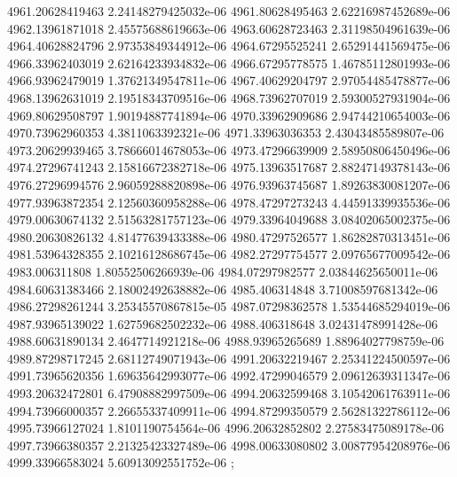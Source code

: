 {4961.20628419463 2.24148279425032e-06
4961.80628495463 2.62216987452689e-06
4962.13961871018 2.45575688619663e-06
4963.60628723463 2.31198504961639e-06
4964.40628824796 2.97353849344912e-06
4964.67295525241 2.65291441569475e-06
4966.33962403019 2.62164233934832e-06
4966.67295778575 1.46785112801993e-06
4966.93962479019 1.37621349547811e-06
4967.40629204797 2.97054485478877e-06
4968.13962631019 2.19518343709516e-06
4968.73962707019 2.59300527931904e-06
4969.80629508797 1.90194887741894e-06
4970.33962909686 2.94744210654003e-06
4970.73962960353 4.3811063392321e-06
4971.33963036353 2.43043485589807e-06
4973.20629939465 3.78666014678053e-06
4973.47296639909 2.58950806450496e-06
4974.27296741243 2.15816672382718e-06
4975.13963517687 2.88247149378143e-06
4976.27296994576 2.96059288820898e-06
4976.93963745687 1.89263830081207e-06
4977.93963872354 2.12560360958288e-06
4978.47297273243 4.44591339935536e-06
4979.00630674132 2.51563281757123e-06
4979.33964049688 3.08402065002375e-06
4980.20630826132 4.81477639433388e-06
4980.47297526577 1.86282870313451e-06
4981.53964328355 2.10216128686745e-06
4982.27297754577 2.09765677009542e-06
4983.006311808 1.80552506266939e-06
4984.07297982577 2.03844625650011e-06
4984.60631383466 2.18002492638882e-06
4985.406314848 3.71008597681342e-06
4986.27298261244 3.25345570867815e-05
4987.07298362578 1.53544685294019e-06
4987.93965139022 1.62759682502232e-06
4988.406318648 3.02431478991428e-06
4988.60631890134 2.4647714921218e-06
4988.93965265689 1.88964027798759e-06
4989.87298717245 2.68112749071943e-06
4991.20632219467 2.25341224500597e-06
4991.73965620356 1.69635642993077e-06
4992.47299046579 2.09612639311347e-06
4993.20632472801 6.47908882997509e-06
4994.20632599468 3.10542061763911e-06
4994.73966000357 2.26655337409911e-06
4994.87299350579 2.56281322786112e-06
4995.73966127024 1.8101190754564e-06
4996.20632852802 2.27583475089178e-06
4997.73966380357 2.21325423327489e-06
4998.00633080802 3.00877954208976e-06
4999.33966583024 5.60913092551752e-06
};